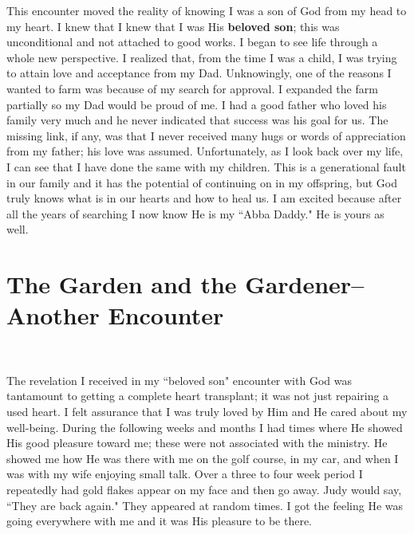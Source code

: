 \documentclass[oneside]{book}
\begin{document}
This encounter moved the reality of knowing I was a son of God from my head to my heart. I knew that I knew that I was His \textbf{beloved son}; this was unconditional and not attached to good works. I began to see life through a whole new perspective. I realized that, from the time I was a child, I was trying to attain love and acceptance from my Dad. Unknowingly, one of the reasons I wanted to farm was because of my search for approval. I expanded the farm partially so my Dad would be proud of me. I had a good father who loved his family very much and he never indicated that success was his goal for us. The missing link, if any, was that I never received many hugs or words of appreciation from my father; his love was assumed. Unfortunately, as I look back over my life, I can see that I have done the same with my children. This is a generational fault in our family and it has the potential of continuing on in my offspring, but God truly knows what is in our hearts and how to heal us. I am excited because after all the years of searching I now know He is my  ``Abba Daddy." He is yours as well. 


\section{The Garden and the Gardener--Another Encounter}
\

The revelation I received in my ``beloved son" encounter with God was tantamount to getting a complete heart transplant; it was not just repairing a used heart. I felt assurance that I was truly loved by Him and He cared about my well-being. During the following weeks and months I had times where He showed His good pleasure toward me; these were not associated with the ministry. He showed me how He was there with me on the golf course, in my car, and when I was with my wife enjoying small talk. Over a three to four week period I repeatedly had gold flakes appear on my face and then go away. Judy would say, ``They are back again." They appeared at random times. I got the feeling He was going everywhere with me and it was His pleasure to be there.
 
\end{document}
